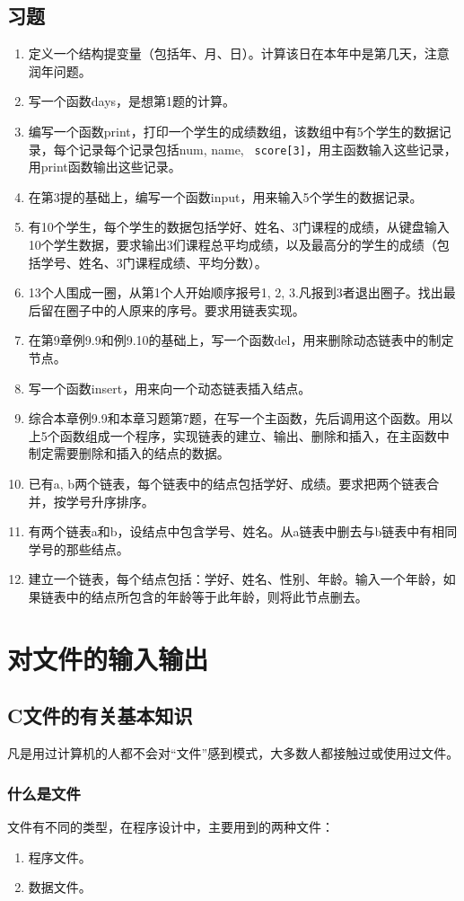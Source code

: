 \section{习题}
\begin{enumerate}
	\item 定义一个结构提变量（包括年、月、日）。计算该日在本年中是第几天，注意润年问题。
	\item 写一个函数days，是想第1题的计算。
	\item 编写一个函数print，打印一个学生的成绩数组，该数组中有5个学生的数据记录，每个记录每个记录包括num, name, \verb| score[3]|，用主函数输入这些记录，用print函数输出这些记录。
	\item 在第3提的基础上，编写一个函数input，用来输入5个学生的数据记录。
	\item 有10个学生，每个学生的数据包括学好、姓名、3门课程的成绩，从键盘输入10个学生数据，要求输出3们课程总平均成绩，以及最高分的学生的成绩（包括学号、姓名、3门课程成绩、平均分数）。
	\item 13个人围成一圈，从第1个人开始顺序报号1, 2, 3.凡报到3者退出圈子。找出最后留在圈子中的人原来的序号。要求用链表实现。
	\item 在第9章例9.9和例9.10的基础上，写一个函数del，用来删除动态链表中的制定节点。
	\item 写一个函数insert，用来向一个动态链表插入结点。
	\item 综合本章例9.9和本章习题第7题，在写一个主函数，先后调用这个函数。用以上5个函数组成一个程序，实现链表的建立、输出、删除和插入，在主函数中制定需要删除和插入的结点的数据。
	\item 已有a, b两个链表，每个链表中的结点包括学好、成绩。要求把两个链表合并，按学号升序排序。
	\item 有两个链表a和b，设结点中包含学号、姓名。从a链表中删去与b链表中有相同学号的那些结点。
	\item 建立一个链表，每个结点包括：学好、姓名、性别、年龄。输入一个年龄，如果链表中的结点所包含的年龄等于此年龄，则将此节点删去。
\end{enumerate}
\chapter{对文件的输入输出}
\section{C文件的有关基本知识}
凡是用过计算机的人都不会对“文件”感到模式，大多数人都接触过或使用过文件。
\subsection{什么是文件}
文件有不同的类型，在程序设计中，主要用到的两种文件：
\begin{enumerate}
	\item 程序文件。
	\item 数据文件。
\end{enumerate}
